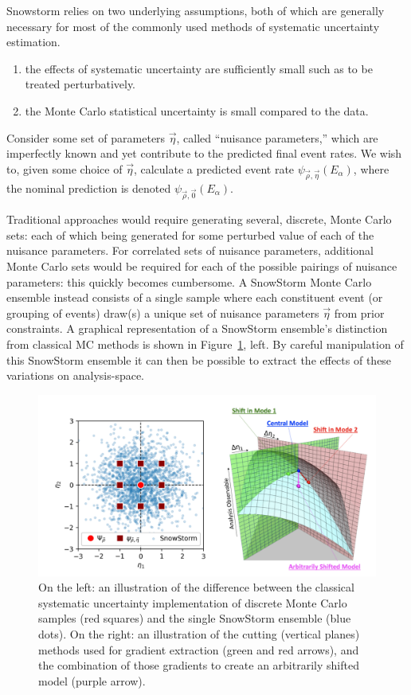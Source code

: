 \documentclass[main.tex]{subfiles}
\begin{document}
Snowstorm relies on two underlying assumptions, both of which are generally necessary for most of the commonly used methods of systematic uncertainty estimation.
\begin{enumerate}
    \item the effects of systematic uncertainty are sufficiently small such as to be treated perturbatively. 
    \item the Monte Carlo statistical uncertainty is small compared to the data.
\end{enumerate}

Consider some set of parameters $\vec{\eta}$, called ``nuisance parameters,'' which are imperfectly known and yet contribute to the predicted final event rates. 
We wish to, given some choice of $\vec{\eta}$, calculate a predicted event rate $\psi_{\vec{\rho}, \vec{\eta}}(E_{\alpha})$, where the nominal prediction is denoted $\psi_{\vec{\rho}, \vec{0}}(E_{\alpha})$.

Traditional approaches would require generating several, discrete, Monte Carlo sets: each of which being generated for some perturbed value of each of the nuisance parameters. 
For correlated sets of nuisance parameters, additional Monte Carlo sets would be required for each of the possible pairings of nuisance parameters: this quickly becomes cumbersome. 
A SnowStorm Monte Carlo ensemble instead consists of a single sample where each constituent event (or grouping of events) draw(s) a unique set of nuisance parameters $\vec{\eta}$ from prior constraints. 
A graphical representation of a SnowStorm ensemble's distinction from classical MC methods is shown in Figure~\ref{fig:snostorm_grad}, left.
By careful manipulation of this SnowStorm ensemble it can then be possible to extract the effects of these variations on analysis-space. 

\begin{figure}
    \centering
    \includegraphics[width=0.6\linewidth]{./figures/wacky_snowstorm.png}
    \caption{On the left: an illustration of the difference between the classical systematic uncertainty implementation of discrete Monte Carlo samples (red squares) and the single SnowStorm ensemble (blue dots). On the right: an illustration of the cutting (vertical planes) methods used for gradient extraction (green and red arrows), and the combination of those gradients to create an arbitrarily shifted model (purple arrow).}\label{fig:snostorm_grad}
\end{figure}
\end{document}
